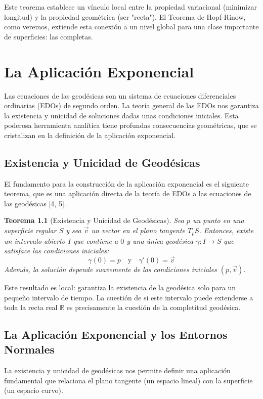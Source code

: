 \documentclass[12pt, a4paper]{report}
\theoremstyle{miestilo}
\newtheorem{teorema}{Teorema}[chapter]
\theoremstyle{midefinicion}
\begin{document}
Este teorema establece un vínculo local entre la propiedad variacional (minimizar longitud) y la propiedad geométrica (ser "recta"). El Teorema de Hopf-Rinow, como veremos, extiende esta conexión a un nivel global para una clase importante de superficies: las completas.

\chapter{La Aplicación Exponencial}

Las ecuaciones de las geodésicas son un sistema de ecuaciones diferenciales ordinarias (EDOs) de segundo orden. La teoría general de las EDOs nos garantiza la existencia y unicidad de soluciones dadas unas condiciones iniciales. Esta poderosa herramienta analítica tiene profundas consecuencias geométricas, que se cristalizan en la definición de la aplicación exponencial.

\section{Existencia y Unicidad de Geodésicas}

El fundamento para la construcción de la aplicación exponencial es el siguiente teorema, que es una aplicación directa de la teoría de EDOs a las ecuaciones de las geodésicas [4, 5].

\begin{teorema}[Existencia y Unicidad de Geodésicas]
Sea $p$ un punto en una superficie regular $S$ y sea $\vec{v}$ un vector en el plano tangente $T_pS$. Entonces, existe un intervalo abierto $I$ que contiene a $0$ y una única geodésica $\gamma: I \to S$ que satisface las condiciones iniciales:
$$\gamma(0) = p \quad \text{y} \quad \gamma'(0) = \vec{v}$$
Además, la solución depende suavemente de las condiciones iniciales $(p, \vec{v})$.
\end{teorema}

Este resultado es local: garantiza la existencia de la geodésica solo para un pequeño intervalo de tiempo. La cuestión de si este intervalo puede extenderse a toda la recta real $\mathbb{R}$ es precisamente la cuestión de la completitud geodésica.

\section{La Aplicación Exponencial y los Entornos Normales}

La existencia y unicidad de geodésicas nos permite definir una aplicación fundamental que relaciona el plano tangente (un espacio lineal) con la superficie (un espacio curvo).
\end{document}
